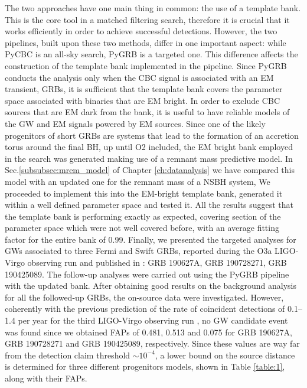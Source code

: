 \documentclass[binding=0.6cm, LaM]{sapthesis}
\begin{document}
	The two approaches have one main thing in common: the use of a template bank.
	This is the core tool in a matched filtering search,  
	therefore it is crucial that it works efficiently in order to achieve successful detections.
	However, the two pipelines, built upon these two methods, differ in one important aspect: 
	while {\ttfamily PyCBC}  is an all-sky search, {\ttfamily PyGRB} is a targeted one.
	This difference affects the construction of the template bank implemented in the pipeline.
	Since {\ttfamily PyGRB} conducts the analysis only when the CBC signal is associated with an EM transient, GRBs,
	it is sufficient that the template bank covers the parameter space associated with binaries that are EM bright.
	In order to exclude CBC sources that are EM dark from the bank, 
	it is useful to have reliable models of the GW and EM signals powered by EM sources.
	Since one of the likely progenitors of short GRBs are systems that 
	lead to the formation of an accretion torus around the final BH,
	up until O2 included, the EM bright bank employed in the search 
	was generated making use of a remnant mass predictive model.
 	In Sec.\ref{subsubsec:mrem_model} of Chapter \ref{ch:datanalysis} we have compared this model \cite{50}
        with an updated one \cite{54} for the remnant mass of a NSBH system,
	We proceeded to implement this into the EM-bright template bank,
        generated  it within a well defined parameter space and tested it.
        All the results suggest that the template bank is performing exactly as expected,
        covering section of the parameter space which were not well covered before,
        with an average fitting factor for the entire bank of 0.99.
	Finally, we presented the targeted analyses for GWs associated to three Fermi and Swift GRBs, 
	reported during the O3a LIGO-Virgo observing run and published in \cite{43434343434343434343434343434343434343434343434343434343434343434343434343434343434343}: 
	GRB 190627A, GRB 190728271, GRB 190425089.
	The follow-up analyses were  carried out using the   {\ttfamily PyGRB}  pipeline  with the updated  bank.
	After obtaining good results on the background analysis for all the followed-up GRBs, 
	the on-source data were investigated.
	However, coherently with the previous prediction of the rate of coincident detections of 0.1–1.4 per year 
	for the third  LIGO-Virgo observing run \cite{55}, no GW candidate event was found since 
	we obtained FAPs of 0.481, 0.513 and 0.075 for GRB 190627A, GRB 190728271 and GRB 190425089, respectively. 
	Since these values are way far from the detection claim threshold $\sim 10^{-4}$,
	a lower bound on the source distance is determined for three different progenitors models,
	shown in Table \ref{table:1}, along with their FAPs.
\end{document}
